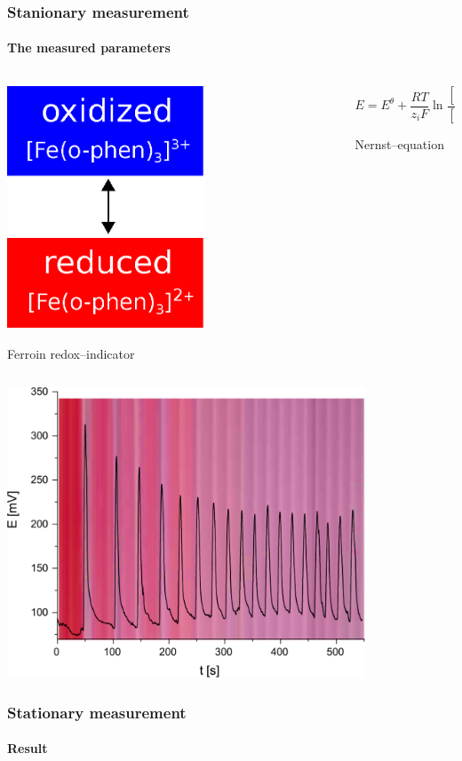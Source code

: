 \documentclass{beamer}
\begin{document}
\begin{frame}
\frametitle{Stanionary measurement}
\framesubtitle{The measured parameters}
\begin{columns}[T] %
\begin{column}{.48\textwidth}

\centering
\includegraphics[width=0.6\textwidth]{ferroin.eps}

Ferroin redox--indicator

\end{column}%
\hfill%
\begin{column}{.48\textwidth}
\centering


\begin{equation*}
        E=E^\theta + \frac{RT}{z_iF} \ln \frac{[Fe^{3+}]}{[Fe^{2+}]}
\end{equation*}

Nernst--equation
\end{column}%
\end{columns}
\end{frame}


\begin{frame}
	\centering
	\includegraphics[width=0.8\textwidth]{pontszerumeres.eps}
	\frametitle{Stationary measurement}
	\framesubtitle{Result}
\end{frame}
\end{document}
